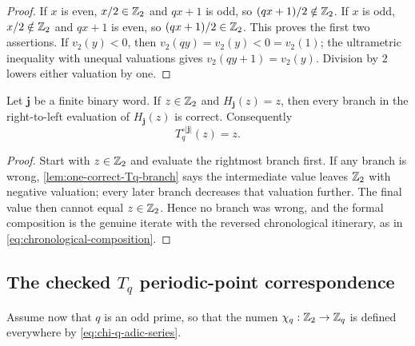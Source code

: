 \begin{proof}
If $x$ is even, $x/2\in\mathbb Z_2$ and $qx+1$ is odd, so
$(qx+1)/2\notin\mathbb Z_2$.  If $x$ is odd, $x/2\notin\mathbb Z_2$ and $qx+1$ is even,
so $(qx+1)/2\in\mathbb Z_2$.  This proves the first two assertions.  If
$v_2(y)<0$, then $v_2(qy)=v_2(y)<0=v_2(1)$; the ultrametric inequality with
unequal valuations gives $v_2(qy+1)=v_2(y)$.  Division by $2$ lowers either
valuation by one.
\end{proof}

\begin{proposition}
\label{prop:Tq-correct-fixed-point}
Let $\mathbf j$ be a finite binary word.  If $z\in\mathbb Z_2$ and
$H_{\mathbf j}(z)=z$, then every branch in the right-to-left evaluation of
$H_{\mathbf j}(z)$ is correct.  Consequently
\[
 T_q^{\circ|\mathbf j|}(z)=z.
\]
\end{proposition}

\begin{proof}
Start with $z\in\mathbb Z_2$ and evaluate the rightmost branch first.  If any branch
is wrong, \cref{lem:one-correct-Tq-branch} says the intermediate value leaves
$\mathbb Z_2$ with negative valuation; every later branch decreases that valuation
further.  The final value then cannot equal $z\in\mathbb Z_2$.  Hence no branch was
wrong, and the formal composition is the genuine iterate with the reversed
chronological itinerary, as in \cref{eq:chronological-composition}.
\end{proof}

\subsection{The checked \texorpdfstring{$T_q$}{Tq}
periodic-point correspondence}

Assume now that $q$ is an odd prime, so that the numen
$\chi_q:\mathbb Z_2\to\mathbb Z_q$ is defined everywhere by
\cref{eq:chi-q-adic-series}.

